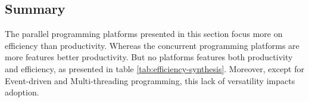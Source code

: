 
\subsection{Summary} \label{chapter3:software-efficiency:summary}

The parallel programming platforms presented in this section focus more on efficiency than productivity.
Whereas the concurrent programming platforms are more features better productivity.
But no platforms features both productivity and efficiency, as presented in table \ref{tab:efficiency-synthesis}.
Moreover, except for Event-driven and Multi-threading programming, this lack of versatility impacts adoption.
















\endinput

Streaming
\cite{Madsen2015}
\cite{Sun2015}

Map Reduce
\cite{Yao2015}


Web assembly
https://medium.com/javascript-scene/what-is-webassembly-the-dawn-of-a-new-era-61256ec5a8f6